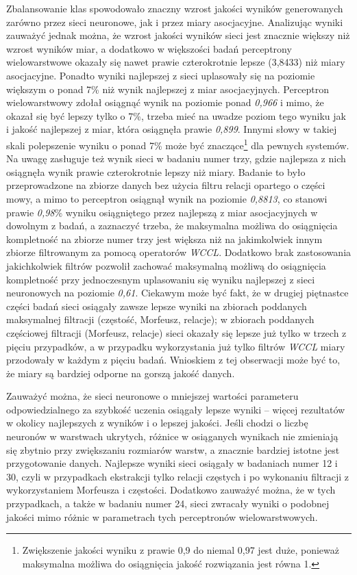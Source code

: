 Zbalansowanie klas spowodowało znaczny wzrost jakości wyników generowanych zarówno przez sieci neuronowe, jak i przez miary asocjacyjne.
Analizując wyniki zauważyć jednak można, że wzrost jakości wyników sieci jest znacznie większy niż wzrost wyników miar, a dodatkowo w większości badań perceptrony wielowarstwowe okazały się nawet prawie czterokrotnie lepsze (3,8433) niż miary asocjacyjne.
Ponadto wyniki najlepszej z sieci uplasowały się na poziomie większym o ponad 7\% niż wynik najlepszej z miar asocjacyjnych. 
Perceptron wielowarstwowy zdołał osiągnąć wynik na poziomie ponad \emph{0,966} i mimo, że okazał się być lepszy tylko o 7\%, trzeba mieć na uwadze poziom tego wyniku jak i jakość najlepszej z miar, która osiągnęła prawie \emph{0,899}.
Innymi słowy w takiej skali polepszenie wyniku o ponad 7\% może być znaczące\footnote{Zwiększenie jakości wyniku z prawie 0,9 do niemal 0,97 jest duże, ponieważ maksymalna możliwa do osiągnięcia jakość rozwiązania jest równa 1.} dla pewnych systemów.
Na uwagę zasługuje też wynik sieci w badaniu numer trzy, gdzie najlepsza z nich osiągnęła wynik prawie czterokrotnie lepszy niż miary.
Badanie to było przeprowadzone na zbiorze danych bez użycia filtru relacji opartego o części mowy, a mimo to perceptron osiągnął wynik na poziomie \emph{0,8813}, co stanowi prawie \emph{0,98}\% wyniku osiągniętego przez najlepszą z miar asocjacyjnych w dowolnym z badań, a zaznaczyć trzeba, że maksymalna możliwa do osiągnięcia kompletność na zbiorze numer trzy jest większa niż na jakimkolwiek innym zbiorze filtrowanym za pomocą operatorów \emph{WCCL}.
Dodatkowo brak zastosowania jakichkolwiek filtrów pozwolił zachować maksymalną możliwą do osiągnięcia kompletność przy jednoczesnym uplasowaniu się wyniku najlepszej z sieci neuronowych na poziomie \emph{0,61}.
Ciekawym może być fakt, że w drugiej piętnastce części badań sieci osiągały zawsze lepsze wyniki na zbiorach poddanych maksymalnej filtracji (częstość, Morfeusz, relacje); w zbiorach poddanych częściowej filtracji (Morfeusz, relacje) sieci okazały się lepsze już tylko w trzech z pięciu przypadków, a w przypadku wykorzystania już tylko filtrów \emph{WCCL} miary przodowały w każdym z pięciu badań.
Wnioskiem z tej obserwacji może być to, że miary są bardziej odporne na gorszą jakość danych.

\par
Zauważyć można, że sieci neuronowe o mniejszej wartości parameteru odpowiedzialnego za szybkość uczenia osiągały lepsze wyniki -- więcej rezultatów w okolicy najlepszych z wyników i o lepszej jakości.
Jeśli chodzi o liczbę neuronów w warstwach ukrytych, różnice w osiąganych wynikach nie zmieniają się zbytnio przy zwiększaniu rozmiarów warstw, a znacznie bardziej istotne jest przygotowanie danych.
Najlepsze wyniki sieci osiągały w badaniach numer 12 i 30, czyli w przypadkach ekstrakcji tylko relacji częstych i po wykonaniu filtracji z wykorzystaniem Morfeusza i częstości.
Dodatkowo zauważyć można, że w tych przypadkach, a także w badaniu numer 24, sieci zwracały wyniki o podobnej jakości mimo różnic w parametrach tych perceptronów wielowarstwowych.

